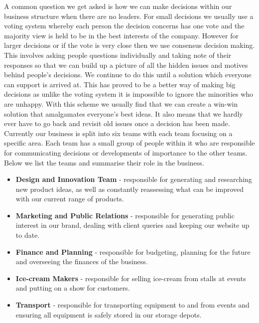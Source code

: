 \documentclass{article}
\begin{document}
  A common question we get asked is how we can make decisions within our business structure when there are no leaders. For small decisions we usually use a voting system whereby each person the decision concerns has one vote and the majority view is held to be in the best interests of the company. However for larger decisions or if the vote is very close then we use consensus decision making. This involves asking people questions individually and taking note of their responses so that we can build up a picture of all the hidden issues and motives behind people's decisions. We continue to do this until a solution which everyone can support is arrived at. This has proved to be a better way of making big decisions as unlike the voting system it is impossible to ignore the minorities who are unhappy. With this scheme we usually find that we can create a win-win solution that amalgamates everyone's best ideas. It also means that we hardly ever have to go back and revisit old issues once a decision has been made. \\

  Currently our business is split into six teams with each team focusing on a specific area. Each team has a small group of people within it who are responsible for communicating decisions or developments of importance to the other teams. Below we list the teams and summarise their role in the business.
  \begin{itemize}

  \item {\bf Design and Innovation Team} - responsible for generating and researching new product ideas, as well as constantly reassessing what can be improved with our current range of products.

  \item {\bf Marketing and Public Relations} - responsible for generating public interest in our brand, dealing with client queries and keeping our website up to date.

  \item {\bf Finance and Planning} - responsible for budgeting, planning for the future and overseeing the finances of the business.

  \item {\bf Ice-cream Makers} - responsible for selling ice-cream from stalls at events and putting on a show for customers.

  \item {\bf Transport} - responsible for transporting equipment to and from events and ensuring all equipment is safely stored in our storage depots.
  
  \end{itemize}
\end{document}

